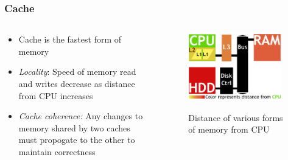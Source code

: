 \documentclass{beamer}
\newcommand{\linespace}{\vskip 0.25cm}
\begin{document}
\begin{frame}
\frametitle{Cache}

\begin{columns}
\begin{column}{0.5\textwidth}
\begin{itemize}
	\item Cache is the fastest form of memory
	\item \emph{Locality}: Speed of memory read and writes decrease as distance from CPU increases
	
	\linespace
	
	\item \emph{Cache coherence:} Any changes to memory shared by two caches must propogate to the other to maintain correctness
\end{itemize}

\end{column}
\begin{column}{0.5\textwidth}
		\begin{figure}
		\includegraphics[width=0.95\textwidth]{Illustrations/CacheAbstract}
		\label{fig:domains}
		\caption{Distance of various forms of memory from CPU}
		\end{figure}
	\end{column}
\end{columns}
\end{frame}
\end{document}
